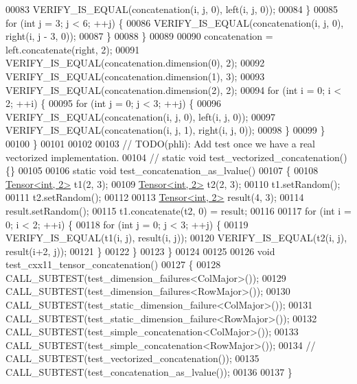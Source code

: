 \begin{DoxyCode}
00083       VERIFY\_IS\_EQUAL(concatenation(i, j, 0), left(i, j, 0));
00084     \}
00085     \textcolor{keywordflow}{for} (\textcolor{keywordtype}{int} j = 3; j < 6; ++j) \{
00086       VERIFY\_IS\_EQUAL(concatenation(i, j, 0), right(i, j - 3, 0));
00087     \}
00088   \}
00089 
00090   concatenation = left.concatenate(right, 2);
00091   VERIFY\_IS\_EQUAL(concatenation.dimension(0), 2);
00092   VERIFY\_IS\_EQUAL(concatenation.dimension(1), 3);
00093   VERIFY\_IS\_EQUAL(concatenation.dimension(2), 2);
00094   \textcolor{keywordflow}{for} (\textcolor{keywordtype}{int} i = 0; i < 2; ++i) \{
00095     \textcolor{keywordflow}{for} (\textcolor{keywordtype}{int} j = 0; j < 3; ++j) \{
00096       VERIFY\_IS\_EQUAL(concatenation(i, j, 0), left(i, j, 0));
00097       VERIFY\_IS\_EQUAL(concatenation(i, j, 1), right(i, j, 0));
00098     \}
00099   \}
00100 \}
00101 
00102 
00103 \textcolor{comment}{// TODO(phli): Add test once we have a real vectorized implementation.}
00104 \textcolor{comment}{// static void test\_vectorized\_concatenation() \{\}}
00105 
00106 \textcolor{keyword}{static} \textcolor{keywordtype}{void} test\_concatenation\_as\_lvalue()
00107 \{
00108   \hyperlink{class_eigen_1_1_tensor}{Tensor<int, 2>} t1(2, 3);
00109   \hyperlink{class_eigen_1_1_tensor}{Tensor<int, 2>} t2(2, 3);
00110   t1.setRandom();
00111   t2.setRandom();
00112 
00113   \hyperlink{class_eigen_1_1_tensor}{Tensor<int, 2>} result(4, 3);
00114   result.setRandom();
00115   t1.concatenate(t2, 0) = result;
00116 
00117   \textcolor{keywordflow}{for} (\textcolor{keywordtype}{int} i = 0; i < 2; ++i) \{
00118     \textcolor{keywordflow}{for} (\textcolor{keywordtype}{int} j = 0; j < 3; ++j) \{
00119       VERIFY\_IS\_EQUAL(t1(i, j), result(i, j));
00120       VERIFY\_IS\_EQUAL(t2(i, j), result(i+2, j));
00121     \}
00122   \}
00123 \}
00124 
00125 
00126 \textcolor{keywordtype}{void} test\_cxx11\_tensor\_concatenation()
00127 \{
00128    CALL\_SUBTEST(test\_dimension\_failures<ColMajor>());
00129    CALL\_SUBTEST(test\_dimension\_failures<RowMajor>());
00130    CALL\_SUBTEST(test\_static\_dimension\_failure<ColMajor>());
00131    CALL\_SUBTEST(test\_static\_dimension\_failure<RowMajor>());
00132    CALL\_SUBTEST(test\_simple\_concatenation<ColMajor>());
00133    CALL\_SUBTEST(test\_simple\_concatenation<RowMajor>());
00134    \textcolor{comment}{// CALL\_SUBTEST(test\_vectorized\_concatenation());}
00135    CALL\_SUBTEST(test\_concatenation\_as\_lvalue());
00136 
00137 \}
\end{DoxyCode}
